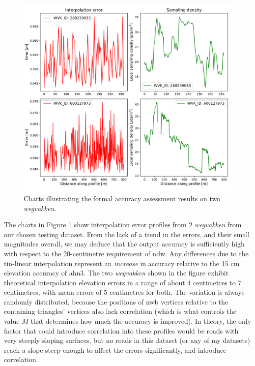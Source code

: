 \begin{figure}
    \centering
    \includegraphics[width=0.9\linewidth]{final_report/figs/formalaccuracy0.pdf}
    \caption{Charts illustrating the formal accuracy assessment results on two \textit{wegvakken}.}
    \label{fig:formalaccuracy0}
\end{figure}

The charts in Figure \ref{fig:formalaccuracy0} show interpolation error profiles from 2 \textit{wegvakken} from our chosen testing dataset. From the lack of a trend in the errors, and their small magnitudes overall, we may deduce that the output accuracy is sufficiently high with respect to the 20-centimetre requirement of \ac{ndw}. Any differences due to the \ac{tin}-linear interpolation represent an \textit{increase} in accuracy relative to the 15 cm elevation accuracy of \ac{ahn3}. The two \textit{wegvakken} shown in the figure exhibit theoretical interpolation elevation errors in a range of about 4 centimetres to 7 centimetres, with mean errors of 5 centimetres for both. The variation is always randomly distributed, because the positions of \ac{nwb} vertices relative to the containing triangles' vertices also lack correlation (which is what controls the value $M$ that determines how much the accuracy is improved). In theory, the only factor that could introduce correlation into these profiles would be roads with very steeply sloping surfaces, but no roads in this dataset (or any of my datasets) reach a slope steep enough to affect the errors significantly, and introduce correlation.

